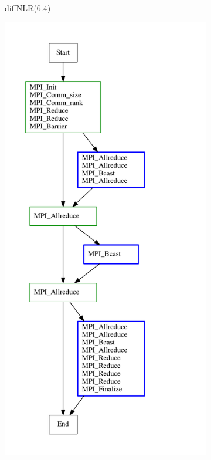 \begin{figure}[]
\begin{subfigure}[b]{0.31\textwidth}
\caption{diffNLR(6.4)}
\label{diffNLR-6-4}
     \end{subfigure}
     \hfill
     \begin{subfigure}[b]{0.31\textwidth}
       \centering
\includegraphics[width=\textwidth]{diffTrace/figs/diffNLR/mpiBug-all-nn-x0.pdf}

\end{subfigure}
\end{figure}
